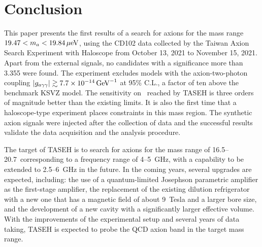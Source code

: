\section{Conclusion} \label{sec:conclusion}
This paper presents the first results of a search for axions for the mass 
range $19.47 < m_a < 19.84 \,\mu\text{e\hspace{-.08em}V}$, using the CD102 data collected by the 
Taiwan Axion Search Experiment with Haloscope from October 13, 2021 
to November 15, 2021. 
Apart from the external signals, no candidates with a significance more than
3.355 were found. The experiment excludes models with the 
axion-two-photon coupling $\left|g_{a\gamma\gamma}\right|\gtrsim 7.7\times 10^{-14}\,\text{Ge\hspace{-.08em}V}^{-1}$ at 95\% C.L.,
 a factor of ten 
above the benchmark KSVZ model. The sensitivity on \gagg\ reached by TASEH 
is three orders of magnitude better than the existing limits. 
It is also the first time that a haloscope-type experiment places 
constraints in this mass region. The synthetic 
axion signals were injected after the collection of data and the 
successful results validate the data acquisition and the analysis procedure. 

The target of TASEH is to search for axions for the mass range of 
16.5--20.7\muevcc\ corresponding to a frequency range of 4--5~GHz, with a 
capability to be extended to 2.5--6~GHz in the future. 
In the coming years, several upgrades are expected, including: the use of a 
quantum-limited Josephson parametric amplifier as the first-stage amplifier, 
the replacement of the existing dilution refrigerator with a new one that has 
a magnetic field of about 9~Tesla and a larger bore size, and the development 
of a new cavity with a significantly larger effective volume. %
With the improvements of the experimental setup and several years of data 
taking, TASEH is expected to probe the QCD axion band in the target mass range.


